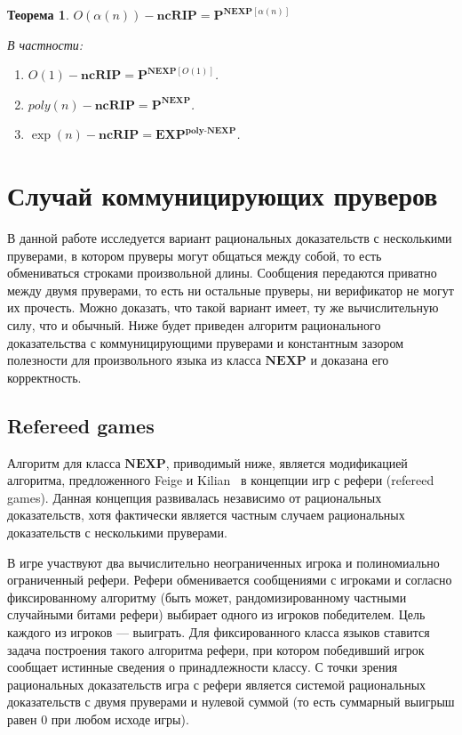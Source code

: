 \documentclass[14pt, a4paper]{extreport}
\newtheorem{theorem}{\indent Теорема}
\begin{document}
        \begin{theorem}
            $O(\alpha(n))-\textbf{ncRIP} = \textbf{P}^{\textbf{NEXP}\left[\alpha(n)\right]}$

            В частности:
            \begin{enumerate}
                \item $ O(1)-\textbf{ncRIP} = {\textbf{P}}^{\textbf{NEXP}[O(1)] }$.
                \item $\textit{poly}(n)-\textbf{ncRIP} = \textbf{P}^{\textbf{NEXP}}$.
                \item $\exp(n)-\textbf{ncRIP} = \textbf{EXP}^{\textbf{poly-NEXP}}$.
            \end{enumerate}
        \end{theorem}


        \chapter{Случай коммуницирующих пруверов}

        В данной работе исследуется вариант рациональных доказательств с несколькими пруверами, в котором пруверы могут общаться между собой, то есть обмениваться строками произвольной длины. Сообщения передаются приватно между двумя пруверами, то есть ни остальные пруверы, ни верификатор не могут их прочесть. Можно доказать, что такой вариант имеет, ту же вычислительную силу, что и обычный. Ниже будет приведен алгоритм рационального доказательства с коммуницирующими пруверами и константным зазором полезности для произвольного языка из класса $\textbf{NEXP}$ и доказана его корректность.

        \section{Refereed games}
        Алгоритм для класса $\textbf{NEXP}$, приводимый ниже, является модификацией алгоритма, предложенного Feige и Kilian~\cite{feige1997refereed} в концепции игр с рефери (refereed games). Данная концепция развивалась независимо от рациональных доказательств, хотя фактически является частным случаем рациональных доказательств с несколькими пруверами.

        В игре участвуют два вычислительно неограниченных игрока и полиномиально ограниченный рефери. Рефери обменивается сообщениями с игроками и согласно фиксированному алгоритму (быть может, рандомизированному частными случайными битами рефери) выбирает одного из игроков победителем. Цель каждого из игроков --- выиграть. Для фиксированного класса языков ставится задача построения такого алгоритма рефери, при котором победивший игрок сообщает истинные сведения о принадлежности классу. С точки зрения рациональных доказательств игра с рефери является системой рациональных доказательств с двумя пруверами и нулевой суммой (то есть суммарный выигрыш равен $0$ при любом исходе игры).
\end{document}
